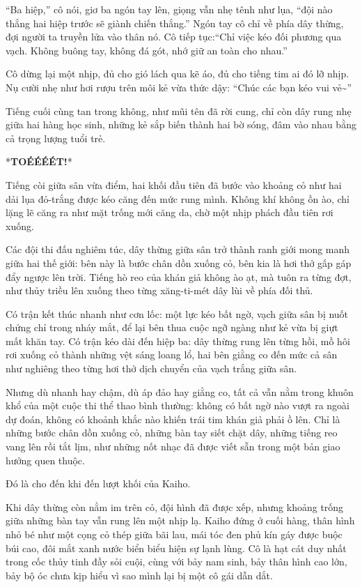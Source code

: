 \documentclass[../main.tex]{subfiles}
\begin{document}
``Ba hiệp,'' cô nói, giơ ba ngón tay lên, giọng vẫn nhẹ tênh như lụa, ``đội nào thắng hai hiệp trước sẽ giành chiến thắng.'' Ngón tay cô chỉ về phía dây thừng, đợi người ta truyền lửa vào thân nó. Cô tiếp tục:``Chỉ việc kéo đối phương qua vạch. Không buông tay, không đá gót, nhớ giữ an toàn cho nhau.''

Cô dừng lại một nhịp, đủ cho gió lách qua kẽ áo, đủ cho tiếng tim ai đó lỡ nhịp. Nụ cười nhẹ như hơi rượu trên môi kẻ vừa thức dậy:  ``Chúc các bạn kéo vui vẻ\~{}''

Tiếng cuối cùng tan trong không, như mũi tên đã rời cung, chỉ còn dây rung nhẹ giữa hai hàng học sinh, những kẻ sắp biến thành hai bờ sóng, đâm vào nhau bằng cả trọng lượng tuổi trẻ.

*\textbf{TOÉÉÉÉT!}*

Tiếng còi giữa sân vừa điểm, hai khối đầu tiên đã bước vào khoảng cỏ như hai dải lụa đỏ-trắng được kéo căng đến mức rung mình. Không khí không ồn ào, chỉ lặng lẽ căng ra như mặt trống mới căng da, chờ một nhịp phách đầu tiên rơi xuống.

Các đội thi đấu nghiêm túc, dây thừng giữa sân trở thành ranh giới mong manh giữa hai thế giới: bên này là bước chân dồn xuống cỏ, bên kia là hơi thở gấp gáp đẩy ngược lên trời. Tiếng hò reo của khán giả không ào ạt, mà tuôn ra từng đợt, như thủy triều lên xuống theo từng xăng-ti-mét dây lùi về phía đối thủ.

Có trận kết thúc nhanh như cơn lốc: một lực kéo bất ngờ, vạch giữa sân bị nuốt chửng chỉ trong nháy mắt, để lại bên thua cuộc ngỡ ngàng như kẻ vừa bị giựt mất khăn tay. Có trận kéo dài đến hiệp ba: dây thừng rung lên từng hồi, mồ hôi rơi xuống cỏ thành những vệt sáng loang lổ, hai bên giằng co đến mức cả sân như nghiêng theo từng hơi thở dịch chuyển của vạch trắng giữa sân.

Nhưng dù nhanh hay chậm, dù áp đảo hay giằng co, tất cả vẫn nằm trong khuôn khổ của một cuộc thi thể thao bình thường: không có bất ngờ nào vượt ra ngoài dự đoán, không có khoảnh khắc nào khiến trái tim khán giả phải ồ lên. Chỉ là những bước chân dồn xuống cỏ, những bàn tay siết chặt dây, những tiếng reo vang lên rồi tắt lịm, như những nốt nhạc đã được viết sẵn trong một bản giao hưởng quen thuộc.

Đó là cho đến khi đến lượt khối của Kaiho.

Khi dây thừng còn nằm im trên cỏ, đội hình đã được xếp, nhưng khoảng trống giữa những bàn tay vẫn rung lên một nhịp lạ. Kaiho đứng ở cuối hàng, thân hình nhỏ bé như một cọng cỏ thép giữa bãi lau, mái tóc đen phủ kín gáy được buộc búi cao, đôi mắt xanh nước biển biểu hiện sự lạnh lùng. Cô là hạt cát duy nhất trong cốc thủy tinh đầy sỏi cuội, cùng với bảy nam sinh, bảy thân hình cao lớn, bảy bộ óc chưa kịp hiểu vì sao mình lại bị một cô gái dẫn dắt.
\end{document}
